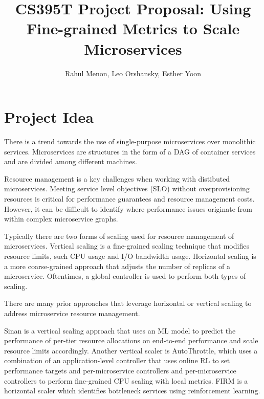 \documentclass{proposal}
\begin{document}

\title{CS395T Project Proposal: Using Fine-grained Metrics to Scale Microservices
}

\author{Rahul Menon, Leo Orshansky, Esther Yoon}

\maketitle

\begin{abstract}
\end{abstract}

\section{Project Idea}
There is a trend towards the use of single-purpose microservices over monolithic services. Microservices are structures in the form of a DAG of container services and are divided among different machines.

Resource management is a key challenges when working with distibuted microservices. Meeting service level objectives (SLO) without overprovisioning resources is critical for performance guarantees and resource management costs. However, it can be difficult to identify where performance issues originate from within complex microservice graphs.

Typically there are two forms of scaling used for resource management of microservices. Vertical scaling is a fine-grained scaling technique that modifies resource limits, such CPU usage and I/O bandwidth usage. Horizontal scaling is a more coarse-grained approach that adjusts the number of replicas of a microservice. Oftentimes, a global controller is used to perform both types of scaling.

There are many prior approaches that leverage horizontal or vertical scaling to address microservice resource management.

Sinan is a vertical scaling approach that uses an ML model to predict the performance of per-tier resource allocations on end-to-end performance and scale resource limits accordingly. Another vertical scaler is AutoThrottle, which uses a combination of an application-level controller that uses online RL to set performance targets and per-microservice controllers and per-microservice controllers to perform fine-grained CPU scaling with local metrics. FIRM is a horizontal scaler which identifies bottleneck services using reinforcement learning. 
\end{document}

